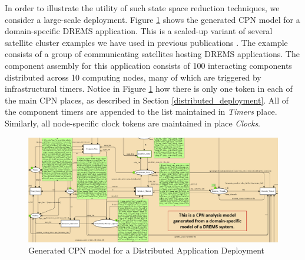In order to illustrate the utility of such state space reduction techniques, we consider a large-scale deployment. Figure \ref{fig:gm} shows the generated CPN model for a domain-specific DREMS application. This is a scaled-up variant of several satellite cluster examples we have used in previous publications \cite{DREMS13Software, kumar2014colored}. The example consists of a group of communicating satellites hosting DREMS applications. The component assembly for this application consists of 100 interacting components distributed across 10 computing nodes, many of which are triggered by infrastructural timers. Notice in Figure \ref{fig:gm} how there is only one token in each of the main CPN places, as described in Section \ref{distributed_deployment}. All of the component timers are appended to the list maintained in \emph{Timers} place. Similarly, all node-specific clock tokens are maintained in place \emph{Clocks}.  

\begin{figure}[h]
	\centering
	\includegraphics[width=\textwidth]{./img/Generated_Model}
	\caption{Generated CPN model for a Distributed Application Deployment}
	\label{fig:gm}
\end{figure}

